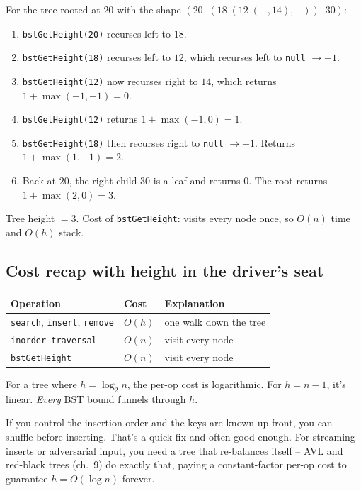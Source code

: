 \documentclass[11pt]{article}
\begin{document}
For the tree rooted at $20$ with the shape $(20 \;\; (18 \;(12\;(-,14),-)) \;\; 30)$:

\begin{enumerate}[leftmargin=*]
    \item \texttt{bstGetHeight(20)} recurses left to $18$.
    \item \texttt{bstGetHeight(18)} recurses left to $12$, which recurses left to \texttt{null} $\rightarrow -1$.
    \item \texttt{bstGetHeight(12)} now recurses right to $14$, which returns $1 + \max(-1, -1) = 0$.
    \item \texttt{bstGetHeight(12)} returns $1 + \max(-1, 0) = 1$.
    \item \texttt{bstGetHeight(18)} then recurses right to \texttt{null} $\rightarrow -1$. Returns $1 + \max(1, -1) = 2$.
    \item Back at $20$, the right child $30$ is a leaf and returns $0$. The root returns $1 + \max(2, 0) = 3$.
\end{enumerate}

Tree height $= 3$. Cost of \texttt{bstGetHeight}: visits every node once, so $O(n)$ time and $O(h)$ stack.

\subsection*{Cost recap with height in the driver's seat}

\begin{center}
\begin{tabular}{lll}
Operation & Cost & Explanation \\
\hline
\texttt{search}, \texttt{insert}, \texttt{remove} & $O(h)$ & one walk down the tree \\
\texttt{inorder traversal}         & $O(n)$ & visit every node \\
\texttt{bstGetHeight}              & $O(n)$ & visit every node \\
\end{tabular}
\end{center}

For a tree where $h = \log_2 n$, the per-op cost is logarithmic. For $h = n - 1$, it's linear. \emph{Every} BST bound funnels through $h$.

\begin{notebox}
If you control the insertion order and the keys are known up front, you can shuffle before inserting. That's a quick fix and often good enough. For streaming inserts or adversarial input, you need a tree that re-balances itself -- AVL and red-black trees (ch.~9) do exactly that, paying a constant-factor per-op cost to guarantee $h = O(\log n)$ forever.
\end{notebox}
\end{document}
